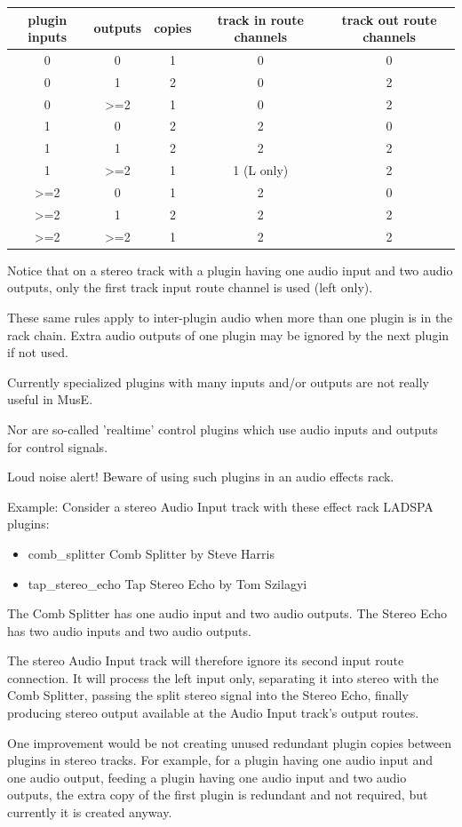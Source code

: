 \documentclass[a4paper]{report}
\begin{document}
\begin{tabular}{|c|c|c|c|c|}
\hline
plugin inputs & outputs & copies & track in route channels &
track out route channels\\
\hline
\hline
0 & 0 & 1 & 0 & 0\\
\hline
0 & 1 & 2 & 0 & 2\\
\hline
0 & >=2 & 1 & 0 & 2\\
\hline
1 & 0 & 2 & 2 & 0\\
\hline
1 & 1 & 2 & 2 & 2\\
\hline
1 & >=2 & 1 & 1 (L only) & 2\\
\hline
>=2 & 0 & 1 & 2 & 0\\
\hline
>=2 & 1 & 2 & 2 & 2\\
\hline
>=2 & >=2 & 1 & 2 & 2\\
\hline
\end{tabular}

Notice that on a stereo track with a plugin having one audio input and
two audio outputs, only the first track input route channel is used
(left only).
 
These same rules apply to inter-plugin audio when more than one plugin 
is in the rack chain. Extra audio outputs of one plugin may be ignored
by the next plugin if not used. 
 
Currently specialized plugins with many inputs and/or outputs are not 
really useful in MusE.

Nor are so-called 'realtime' control plugins which use audio inputs 
and outputs for control signals. 

Loud noise alert! Beware of using such plugins in an audio effects
rack. 

Example: Consider a stereo Audio Input track with these effect rack 
 LADSPA plugins: 
 
\begin{itemize}
\item comb\_splitter Comb Splitter by Steve Harris
\item tap\_stereo\_echo Tap Stereo Echo by Tom Szilagyi
\end{itemize}
    

The Comb Splitter has one audio input and two audio outputs. 
The Stereo Echo has two audio inputs and two audio outputs.
  
The stereo Audio Input track will therefore ignore its second
input route connection. It will process the left input only,
separating it into stereo with the Comb Splitter, passing the  
split stereo signal into the Stereo Echo, finally producing 
stereo output available at the Audio Input track's output routes.      
  
  
One improvement would be not creating unused redundant plugin copies
between plugins in stereo tracks.
For example, for a plugin having one audio input and one audio output,
feeding a plugin having one audio input and two audio outputs,  
the extra copy of the first plugin is redundant and not required,
but currently it is created anyway.
\end{document}
